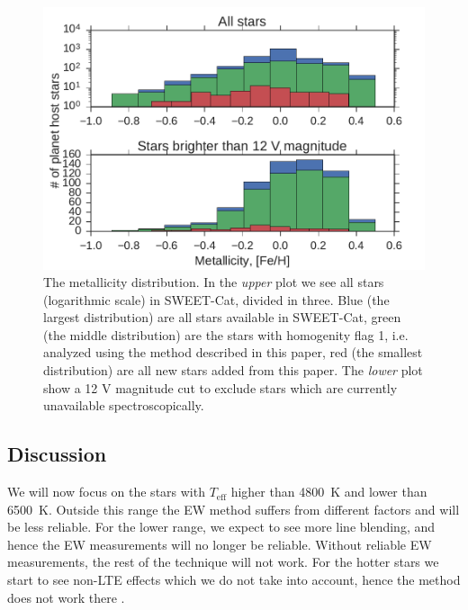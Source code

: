 \documentclass{aa}
\begin{document}
\begin{figure}[tpb]
    \centering
    \includegraphics[width=1.0\linewidth,natwidth=450,natheight=300]{figures/metallicityDistribution.pdf}
    \caption{The metallicity distribution. In the \emph{upper} plot we see all
             stars (logarithmic scale) in SWEET-Cat, divided in three. Blue
             (the largest distribution) are all stars available in SWEET-Cat,
             green (the middle distribution) are the stars with homogenity flag
             1, i.e. analyzed using the method described in this paper, red
             (the smallest distribution) are all new stars added from this
             paper. The \emph{lower} plot show a 12 V magnitude cut to exclude
             stars which are currently unavailable spectroscopically.}
    \label{fig:distribution}
\end{figure}



\subsection{Discussion}
\label{sec:Discussion}
We will now focus on the stars with $T_\mathrm{eff}$ higher than \SI{4800}{K}
and lower than \SI{6500}{K}. Outside this range the EW method suffers from
different factors and will be less reliable. For the lower range, we expect to
see more line blending, and hence the EW measurements will no longer be
reliable. Without reliable EW measurements, the rest of the technique will not
work. For the hotter stars we start to see non-LTE effects which we do not take
into account, hence the method does not work there \citep{Gray2006}.
\end{document}

